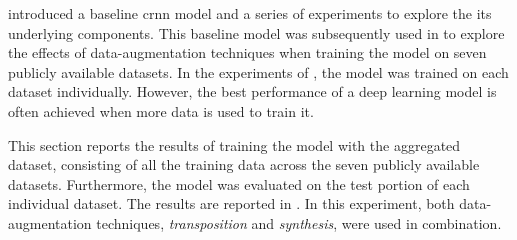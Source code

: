
 introduced a baseline \gls{crnn}
model and a series of experiments to explore the its
underlying components. This baseline model was subsequently
used in  to explore the
effects of data-augmentation techniques when training the
model on seven publicly available datasets. In the
experiments of , the model
was trained on each dataset individually. However, the best
performance of a deep learning model is often achieved when
more data is used to train it.

This section reports the results of training the model with
the aggregated dataset, consisting of all the training data
across the seven publicly available datasets. Furthermore,
the model was evaluated on the test portion of each
individual dataset. The results are reported in
. In this experiment, both
data-augmentation techniques, \emph{transposition} and
\emph{synthesis}, were used in combination. 

